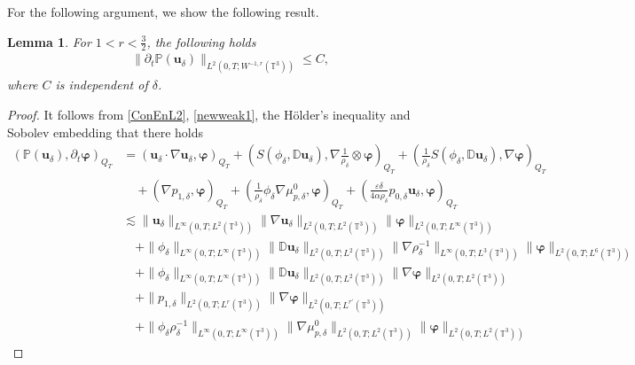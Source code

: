 \documentclass[reqno,a4paper,11pt]{amsart}
\theoremstyle{plain}
\newtheorem{lemma}[theorem]{Lemma}
\numberwithin{equation}{section}
\begin{document}
			For the following argument, we show the following result.
			\begin{lemma}\label{diverge free}
				For $1<r<\frac{3}{2}$, the following holds
				\begin{align*}
					\|\partial_{t}\mathbb{P}(\mathbf{u}_{\delta})\|_{L^{2}(0,T;W^{-1,r}(\mathbb{T}^{3}))}\leq C,
				\end{align*}
				where $C$ is independent of $\delta$.
			\end{lemma}
			\begin{proof}
				It follows from \eqref{ConEnL2}, \eqref{newweak1}, the H\"{o}lder's inequality and Sobolev embedding that there holds
				\begin{align}\label{d5.1}
					\nonumber(\mathbb{P}(\mathbf{u}_{\delta}),\partial_{t}\boldsymbol{\varphi})_{Q_{T}} &=(\mathbf{u}_{\delta}\cdot\nabla
					\mathbf{u}_{\delta},\boldsymbol{\varphi})_{Q_{T}}+( S(\phi_{\delta},\mathbb{ D}\mathbf{u}_{\delta}),\nabla\frac{1}{\rho_{\delta}}\otimes\boldsymbol{\varphi})_{Q_{T}}+( \frac{1}{\rho_{\delta}}S(\phi_{\delta},\mathbb{ D}\mathbf{u}_{\delta}),\nabla\boldsymbol{\varphi})_{Q_{T}}
					\nonumber \\&\quad+(\nabla p_{1,\delta},\boldsymbol{\varphi})_{Q_{T}}
					+(\frac{1}{\rho_{\delta}}\phi_{\delta} \nabla \mu_{p,\delta}^{0},\boldsymbol{\varphi})_{Q_{T}}
					+(\frac{\varepsilon\delta}{4\alpha\rho_{\delta}}p_{0,\delta} \mathbf{u}_{\delta},\boldsymbol{\varphi})_{Q_{T}}
					\nonumber \\  \nonumber&\lesssim\|\mathbf{u}_{\delta}\|_{L^{\infty}(0,T;L^{2}(\mathbb{T}^{3}))}\|\nabla\mathbf{u}_{\delta}\|_{L^{2}(0,T;L^{2}(\mathbb{T}^{3}))}\|\boldsymbol{\varphi}\|_{L^{2}(0,T;L^{\infty}(\mathbb{T}^{3}))}
					\\& \nonumber\quad+\|\phi_{\delta}\|_{L^{\infty}(0,T;L^{\infty}(\mathbb{T}^{3}))}\|\mathbb{ D}\mathbf{u}_{\delta}\|_{L^{2}(0,T;L^{2}(\mathbb{T}^{3}))}\|\nabla\rho_{\delta}^{-1}\|_{L^{\infty}(0,T;L^{3}(\mathbb{T}^{3}))}\|\boldsymbol{\varphi}\|_{L^{2}(0,T;L^{6}(\mathbb{T}^{3}))}
					\\& \nonumber\quad+\|\phi_{\delta}\|_{L^{\infty}(0,T;L^{\infty}(\mathbb{T}^{3}))}\|\mathbb{ D}\mathbf{u}_{\delta}\|_{L^{2}(0,T;L^{2}(\mathbb{T}^{3}))}\|\nabla\boldsymbol{\varphi}\|_{L^{2}(0,T;L^{2}(\mathbb{T}^{3}))}
					\\&  \nonumber\quad+\|p_{1,\delta}\|_{L^{2}(0,T;L^{r}(\mathbb{T}^{3}))}\|\nabla\boldsymbol{\varphi}\|_{L^{2}(0,T;L^{r'}(\mathbb{T}^{3}))}
					\\&  \nonumber\quad+\|\phi_{\delta}\rho_{\delta}^{-1}\|_{L^{\infty}(0,T;L^{\infty}(\mathbb{T}^{3}))}\|\nabla \mu_{p,\delta}^{0}\|_{L^{2}(0,T;L^{2}(\mathbb{T}^{3}))}\|\boldsymbol{\varphi}\|_{L^{2}(0,T;L^{2}(\mathbb{T}^{3}))}

\end{align}
\end{proof}
\end{document}
